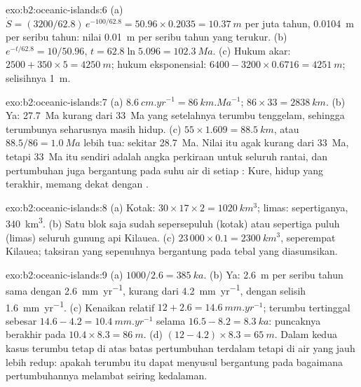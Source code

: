 \begin{solution}{exo:b2:oceanic-islands:6}
(a) $\dot S = (3200/62.8)\,e^{-100/62.8} = 50.96\times0.2035 = \qty{10.37}{m}$ per juta tahun,
\qty{0.0104}{m} per seribu tahun: nilai \qty{0.01}{m} per seribu tahun yang terukur. (b) $e^{-t/62.8}
= 10/50.96$, $t = 62.8\ln5.096 = \qty{102.3}{Ma}$. (c) Hukum akar: $2500 + 350\times5 =
\qty{4250}{m}$; hukum eksponensial: $6400 - 3200\times0.6716 = \qty{4251}{m}$; selisihnya
\qty{1}{m}.
\end{solution}

\begin{solution}{exo:b2:oceanic-islands:7}
(a) $\qty{8.6}{cm.yr^{-1}} = \qty{86}{km.Ma^{-1}}$; $86\times33 = \qty{2838}{km}$. (b) Ya:
\qty{27.7}{Ma} kurang dari \qty{33}{Ma} yang setelahnya terumbu tenggelam, sehingga terumbunya seharusnya
masih hidup. (c) $55\times1.609 = \qty{88.5}{km}$, atau $88.5/86 = \qty{1.0}{Ma}$ lebih tua: sekitar
\qty{28.7}{Ma}. Nilai itu agak kurang dari \qty{33}{Ma}, tetapi \qty{33}{Ma} itu sendiri adalah
angka perkiraan untuk seluruh rantai, dan pertumbuhan juga bergantung pada suhu air di setiap
: Kure,  hidup yang terakhir, memang dekat dengan .
\end{solution}

\begin{solution}{exo:b2:oceanic-islands:8}
(a) Kotak: $30\times17\times2 = \qty{1020}{km^3}$; limas: sepertiganya, \qty{340}{km^3}. (b) Satu blok
saja sudah sepersepuluh (kotak) atau sepertiga puluh (limas) seluruh gunung api Kilauea. (c) $23\,000\times
0.1 = \qty{2300}{km^3}$, seperempat Kilauea; taksiran yang sepenuhnya bergantung pada tebal
yang diasumsikan.
\end{solution}

\begin{solution}{exo:b2:oceanic-islands:9}
(a) $1000/2.6 = \qty{385}{ka}$. (b) Ya: \qty{2.6}{m} per seribu tahun sama dengan
\qty{2.6}{mm.yr^{-1}}, kurang dari \qty{4.2}{mm.yr^{-1}}, dengan selisih \qty{1.6}{mm.yr^{-1}}.
(c) Kenaikan relatif $12 + 2.6 = \qty{14.6}{mm.yr^{-1}}$; terumbu tertinggal sebesar $14.6 - 4.2 =
\qty{10.4}{mm.yr^{-1}}$ selama $16.5 - 8.2 = \qty{8.3}{ka}$: puncaknya berakhir pada $10.4\times8.3 =
\qty{86}{m}$. (d) $(12 - 4.2)\times8.3 = \qty{65}{m}$. Dalam kedua kasus terumbu tetap di atas batas pertumbuhan
terdalam tetapi di air yang jauh lebih redup: apakah terumbu itu dapat menyusul bergantung pada bagaimana pertumbuhannya melambat seiring
kedalaman.
\end{solution}

